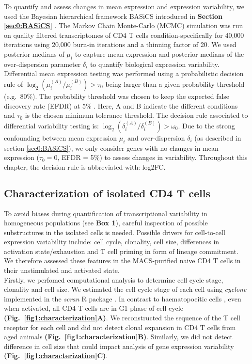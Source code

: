 To quantify and assess changes in mean expression and expression variability, we used the Bayesian hierarchical framework BASiCS introduced in \textbf{Section \ref{sec0:BASiCS}} \citep{Vallejos2015BASiCS, Vallejos2016}. The Markov Chain Monte-Carlo (MCMC) simulation was run on quality filtered transcriptomes of CD4\plus{} T cells condition-specifically for 40,000 iterations using 20,000 burn-in iterations and a thinning factor of 20. We used posterior medians of $\mu_i$ to capture mean expression and posterior medians of the over-dispersion parameter $\delta_i$ to quantify biological expression variability. Differential mean expression testing was performed using a probabilistic decision rule of $\log_2(\mu_i^{(A)}/\mu_i^{(B)})>\tau_0$ being larger than a given probability threshold (e.g.~80\%). The probability threshold was chosen to keep the expected false discovery rate (EFDR) at 5\% \citep{Vallejos2016}. Here, A and B indicate the different conditions and $\tau_0$ is the chosen minimum tolerance threshold. The decision rule associated to differential variability testing is: $\log_2(\delta_i^{(A)}/\delta_i^{(B)})>\omega_0$. Due to the strong confounding between mean expression $\mu_i$ and over-dispersion $\delta_i$ (as described in section \ref{sec0:BASiCS}), we only consider genes with no changes in mean expression ($\tau_0=0$, EFDR = 5\%) to assess changes in variability. Throughout this chapter, the decision rule is abbreviated with: log2FC. 

\newpage

\subsection{Characterization of isolated CD4\plus{} T cells}
\label{sec1:characterization}

To avoid biases during quantification of transcriptional variability in homogeneous populations (see \textbf{Box 1}), careful inspection of possible substructures in the isolated cells is needed. Possible drivers for cell-to-cell expression variability include: cell cycle, clonality, cell size, differences in activation state/exhaustion and T cell priming in form of lineage commitment. We therefore assessed these features in the MACS-purified naive CD4\plus{} T cells in their unstimulated and activated state.\\

Firstly, we perfomed computational analysis to determine cell cycle stage, clonality and cell size. We estimated the cell cycle stage of each cell using \emph{cyclone} \citep{Scialdone2015} implemented in the \emph{scran} R package \citep{Lun2016}. In contrast to haematopoeitic cells \citep{Kowalczyk2015}, even when activated, all CD4\plus{} T cells are in G1 phase of cell cycle \textbf{(Fig.~\ref{fig1:characterization}A)}. We reconstructed the sequence of the T cell receptor for each cell \citep{Stubbington2015} and did not detect clonal expansion in CD4\plus{} T cells from aged animals \textbf{(Fig.~\ref{fig1:characterization}B)}. Similarly, we did not detect difference in cell size that could impact analysis of gene expression variability \textbf{(Fig.~\ref{fig1:characterization}C)}. \\

